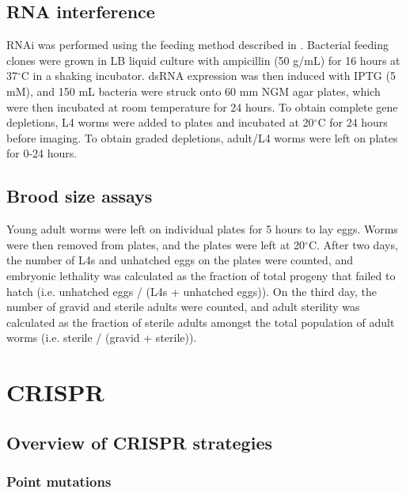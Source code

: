 \documentclass[12pt]{"report"}
\begin{document}
\subsection{RNA interference}

RNAi was performed using the feeding method described in \textcite{Kamath2003}. Bacterial feeding clones were grown in LB liquid culture with ampicillin (50 \textmu g/mL) for 16 hours at 37$^{\circ}$C in a shaking incubator. dsRNA expression was then induced with IPTG (5 mM), and 150 mL bacteria were struck onto 60 mm NGM agar plates, which were then incubated at room temperature for 24 hours. To obtain complete gene depletions, L4 worms were added to plates and incubated at 20$^{\circ}$C for 24 hours before imaging. To obtain graded depletions, adult/L4 worms were left on plates for 0-24 hours.\\

\subsection{Brood size assays}

Young adult worms were left on individual plates for 5 hours to lay eggs. Worms were then removed from  plates, and the plates were left at 20$^{\circ}$C. After two days, the number of L4s and unhatched eggs on the plates were counted, and embryonic lethality was calculated as the fraction of total progeny that failed to hatch (i.e. unhatched eggs / (L4s + unhatched eggs)). On the third day, the number of gravid and sterile adults were counted, and adult sterility was calculated as the fraction of sterile adults amongst the total population of adult worms (i.e. sterile / (gravid + sterile)).

\section{CRISPR}

\subsection{Overview of CRISPR strategies}

\subsubsection{Point mutations}
\end{document}
